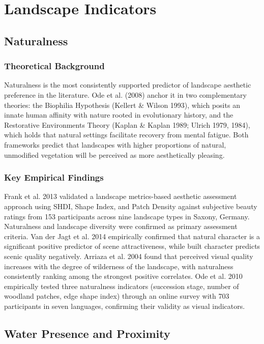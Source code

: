 \documentclass[hidelinks, 11pt]{article}
\begin{document}
\section{Landscape Indicators}\label{sec:LI}
\subsection{Naturalness}\label{sec:Na}
\subsubsection{Theoretical Background}
Naturalness is the most consistently supported predictor of landscape aesthetic preference in the literature. Ode et al. (2008) anchor it in two complementary theories: the Biophilia Hypothesis (Kellert & Wilson 1993), which posits an innate human affinity with nature rooted in evolutionary history, and the Restorative Environments Theory (Kaplan & Kaplan 1989; Ulrich 1979, 1984), which holds that natural settings facilitate recovery from mental fatigue. Both frameworks predict that landscapes with higher proportions of natural, unmodified vegetation will be perceived as more aesthetically pleasing.

\subsubsection{Key Empirical Findings}
    Frank et al. 2013 validated a landscape metrics-based aesthetic 
    assessment approach using SHDI, Shape Index, and Patch Density against 
    subjective beauty ratings from 153 participants across nine landscape types 
    in Saxony, Germany. Naturalness and landscape diversity were confirmed as 
    primary assessment criteria. Van der Jagt et al. 2014 empirically confirmed that natural character 
    is a significant positive predictor of scene attractiveness, while built 
    character predicts scenic quality negatively. Arriaza et al. 2004 found that perceived visual quality increases 
    with the degree of wilderness of the landscape, with naturalness consistently 
    ranking among the strongest positive correlates. Ode et al. 2010 empirically tested three naturalness indicators 
    (succession stage, number of woodland patches, edge shape index) through an 
    online survey with 703 participants in seven languages, confirming their 
    validity as visual indicators.
\subsection{Water Presence and Proximity}\label{sec:WP}
\end{document}
